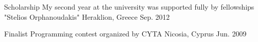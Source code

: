 \begin{cvhonors}
	\cvhonor
	{Scholarship} %
	{My second year at the university was supported fully by
		fellowships "Stelios Orphanoudakis"} %
	{Heraklion, Greece} %
	{Sep. 2012} %

	\cvhonor
	{Finalist} %
	{Programming contest organized by CYTA} %
	{Nicosia, Cyprus} %
	{Jun. 2009} %

\end{cvhonors}

